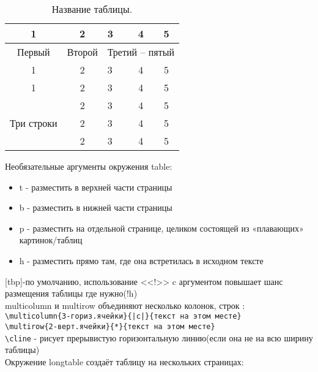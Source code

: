 \documentclass[a4paper,12pt]{article}%
\theoremstyle{plain}%
\theoremstyle{definition}%
\theoremstyle{remark}%
\begin{document}
\begin{table}[!h]%
\begin{center}%
\caption[Таблица]{Название таблицы.}\label{tab:mytab}
\begin{tabular}{|c|c|l|c|c|}
\hline 1 & 2 & 3 & 4 & 5 \\
\hline Первый & Второй & \multicolumn{3}{c|}{Третий -- пятый}\\
\cline{1-1} \cline{3-5} 1 & 2 & 3 & 4 & 5\\
\hline 1 & 2 & 3 & 4 & 5\\
\hline \multirow{3}{*}{Три строки} & 2 & 3 & 4 & 5\\
\cline{2-5} & 2 & 3 & 4 & 5\\
\cline{2-5} & 2 & 3 & 4 & 5\\
\hline
\end{tabular}
\end{center}
\end{table}

Необязательные аргументы окружения table:
\begin{itemize}
\item t - разместить в верхней части страницы
\item b - разместить в нижней части страницы
\item p - разместить на отдельной странице, целиком состоящей из «плавающих» картинок/таблиц
\item h - разместить прямо там, где она встретилась в исходном тексте
\end{itemize}
[tbp]-по умолчанию, использование <<!>> c аргументом повышает шанс размещения таблицы где нужно(!h) \\
multicolumn и multirow объединяют несколько колонок, строк : \\
\verb/\multicolumn{3-гориз.ячейки}{|c|}{текст на этом месте}/ \\
\verb|\multirow{2-верт.ячейки}{*}{текст на этом месте}| \\
\verb|\cline| - рисует прерывистую горизонтальную линию(если она не на всю ширину таблицы) \\

Окружение longtable создаёт таблицу на нескольких страницах:
\end{document}
